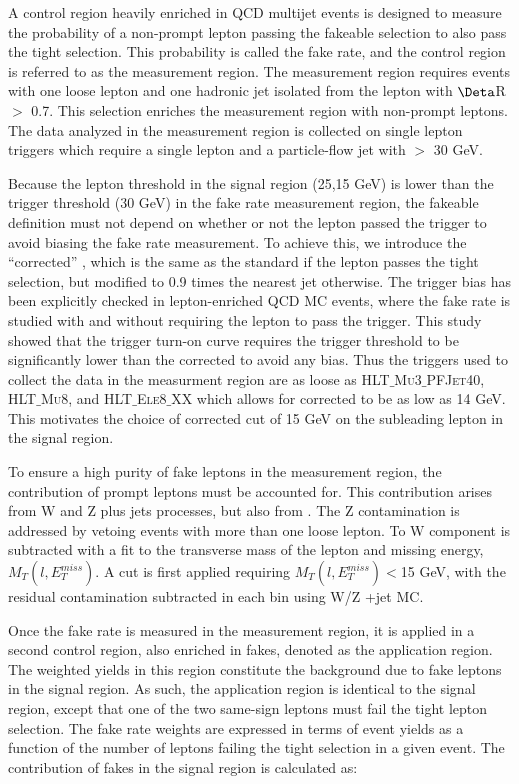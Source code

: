 A control region heavily enriched in QCD multijet events is designed to measure the probability of a non-prompt lepton passing the fakeable selection to also pass the tight selection.
This probability is called the fake rate, and the control region is referred to as the measurement region. The measurement region requires events with one loose lepton and one
hadronic jet isolated from the lepton with $\Deta$R $\gt$ 0.7. This selection enriches the measurement region with non-prompt leptons. The data analyzed in the measurement region is collected on single lepton
triggers which require a single lepton and a particle-flow jet with \pt $\gt$ 30 GeV.

Because the lepton \pt threshold in the signal region (25,15 GeV) is lower than the trigger threshold (30 GeV) in the fake rate measurement region,
the fakeable definition must not depend on whether or not the lepton passed the trigger to avoid biasing the fake rate measurement. To achieve this, we introduce the ``corrected'' \pt, which is the
same as the standard \pt if the lepton passes the tight selection, but modified to 0.9 times the nearest jet \pt otherwise. The trigger bias has been explicitly checked in lepton-enriched QCD MC events, 
where the fake rate is studied with and without requiring the lepton to pass the trigger. This study showed that the trigger turn-on curve requires the trigger \pt threshold to be significantly lower than
the corrected \pt to avoid any bias. Thus the triggers used to collect the data in the measurment region are as loose as \textsc{HLT$\_$Mu3$\_$PFJet40}, \textsc{HLT$\_$Mu8}, and \textsc{HLT$\_$Ele8$\_$XX}
 which allows for corrected \pt to be as low as 14 GeV.
This motivates the choice of corrected \pt cut of 15 GeV on the subleading lepton in the signal region. 

To ensure a high purity of fake leptons in the measurement region, the contribution of prompt leptons must be accounted for. This contribution arises from W and Z plus jets processes, but also from \ttbar. The Z contamination
is addressed by vetoing events with more than one loose lepton. To W component is subtracted with a fit to the transverse mass of the lepton and missing energy, $M_{T}(l,E_{T}^{miss})$. A cut is first applied requiring
$M_{T}(l,E_{T}^{miss}) < $15 GeV, with the residual contamination subtracted in each \pt bin using W/Z +jet MC. 

Once the fake rate is measured in the measurement region, it is applied in a second control region, also enriched in fakes, denoted as the application region. The weighted yields in this region constitute the background due to
fake leptons in the signal region. As such, the application region is identical to the signal region, except that one of the two same-sign leptons must fail the tight lepton selection. The fake rate weights are expressed
in terms of event yields as a function of the number of leptons failing the tight selection in a given event. The contribution of fakes in the signal region is calculated as:

